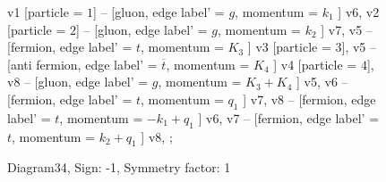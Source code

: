 \documentclass{revtex4}
\begin{document}
\begin{figure}[!htb]
\begin{center}
{    %
v1 [particle = \(1\)] -- [gluon, edge label' = \(g\), momentum = \(k_{1}\) ] v6, 
v2 [particle = \(2\)] -- [gluon, edge label' = \(g\), momentum = \(k_{2}\) ] v7, 
v5 -- [fermion, edge label' = \(t\), momentum = \(K_{3}\) ] v3 [particle = \(3\)], 
v5 -- [anti fermion, edge label' = \(\overline{t}\), momentum = \(K_{4}\) ] v4 [particle = \(4\)], 
v8 -- [gluon, edge label' = \(g\), momentum = \(K_{3} + K_{4}\) ] v5, 
v6 -- [fermion, edge label' = \(t\), momentum = \(q_{1}\) ] v7, 
v8 -- [fermion, edge label' = \(t\), momentum = \(-k_{1} + q_{1}\) ] v6, 
v7 -- [fermion, edge label' = \(t\), momentum = \(k_{2} + q_{1}\) ] v8, 
};
\end{center}
\caption{Diagram34, Sign: -1, Symmetry factor: 1}
\end{figure}
\newpage
\end{document}
